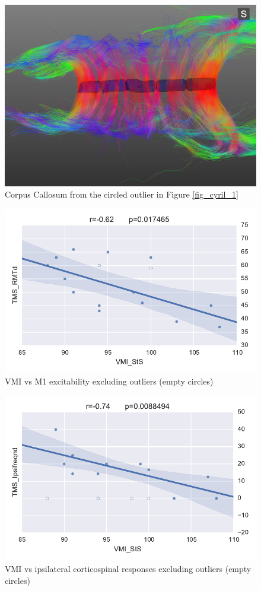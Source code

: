 \documentclass{frontiersHLTH}
\begin{document}
\begin{figure}
	\centering
		\includegraphics[width=\linewidth]{cc_cyril}
	\caption{Corpus Callosum from the circled outlier in Figure \ref{fig_cyril_1}}
	\label{fig_cyril_2}
\end{figure}


\begin{figure}
	\centering
		\includegraphics[width=0.9\linewidth]{cyricl_corr_1}
	\caption{VMI vs M1 excitability excluding outliers (empty circles)}
	\label{fig_cyril_4}
\end{figure}

\begin{figure}
	\centering
		\includegraphics[width=0.9\linewidth]{corr_cyril_2}
	\caption{VMI vs ipsilateral corticospinal responses excluding outliers (empty circles)}
	\label{fig_cyril_5}
\end{figure}
\end{document}
